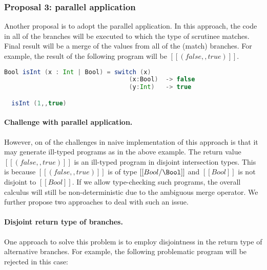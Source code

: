 




\subsubsection{Proposal 3: parallel application}
Another proposal is to adopt the parallel application.
In this approach, the code in all of the branches will be
executed to which the type of scrutinee matches. Final result
will be a merge of the values from all of the (match) branches.
For example, the result of the following
program will be $[[(false,,true)]]$.

\begin{lstlisting}[language=Scala]
  Bool isInt (x : Int | Bool) = switch (x)
                                  (x:Bool)  -> false
                                  (y:Int)   -> true

  isInt (1,,true)
\end{lstlisting}

\paragraph*{Challenge with parallel application.}
However, on of the challenges in naive implementation
of this approach is that it may generate ill-typed programs
as in the above example. The return value
$[[(false,,true)]]$ is an ill-typed program
in disjoint intersection types.
This is because $[[(false,,true)]]$ is of type
$[[Bool/\Bool]]$ and $[[Bool]]$ is not disjoint
to $[[Bool]]$. If we allow type-checking such
programs, the overall calculus will still be
non-deterministic due to the ambiguous merge operator.
We further propose two approaches to deal with such an issue.

\paragraph{Disjoint return type of branches.}
One approach to solve this problem is to employ disjointness
in the return type of alternative branches.
For example, the following problematic program will
be rejected in this case:


